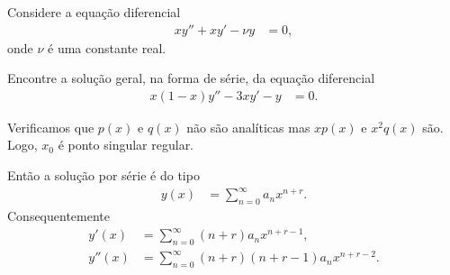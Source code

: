 \documentclass[a4paper,12pt, leqno, answers]{exam}
\begin{document}
\begin{questions}
    \question[P1 de 2010] Considere a equa\c{c}\~{a}o diferencial
    \begin{align*}
        x y'' + x y' - \nu y &= 0,
    \end{align*}
    onde $\nu$ \'{e} uma constante real.

    \question[E de 2010, T2 de 2011] Encontre a solu\c{c}\~{a}o geral, na forma de s\'{e}rie, da equa\c{c}\~{a}o diferencial
    \begin{align*}
        x (1 - x) y'' - 3 x y' - y &= 0.
    \end{align*}
    \begin{solution}
        Verificamos que $p(x)$ e $q(x)$ n\~{a}o s\~{a}o anal\'{i}ticas mas $x p(x)$ e $x^2 q(x)$ s\~{a}o. Logo, $x_0$ \'{e} ponto singular regular.

        Ent\~{a}o a solu\c{c}\~{a}o por s\'{e}rie \'{e} do tipo
        \begin{align*}
            y(x) &= \sum_{n = 0}^\infty a_n x^{n + r}.
        \end{align*}
        Consequentemente
        \begin{align*}
            y'(x) &= \sum_{n = 0}^\infty \left( n + r \right) a_n x^{n + r - 1}, \\
            y''(x) &= \sum_{n = 0}^\infty \left( n + r \right) \left( n + r - 1 \right) a_n x^{n + r - 2}.
        \end{align*}
        

\end{solution}
\end{questions}
\end{document}
